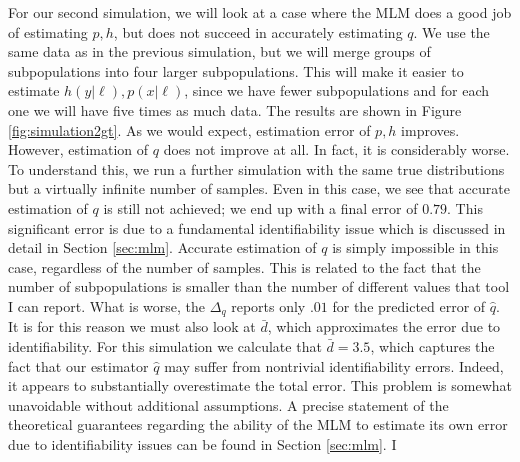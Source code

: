 For our second simulation, we will look at a case where the MLM does a good job of estimating $p,h$, but does not succeed in accurately estimating $q$.   We use the same data as in the previous simulation, but we will merge groups of subpopulations into four larger subpopulations.  This will make it easier to estimate $h(y|\ell),p(x|\ell)$, since we have fewer subpopulations and for each one we will have five times as much data.  The results are shown in Figure \ref{fig:simulation2gt}.  As we would expect, estimation error of $p,h$ improves.  However, estimation of $q$ does not improve at all.  In fact, it is considerably worse.  To understand this, we run a further simulation with the same true distributions but a virtually infinite number of samples.  Even in this case, we see that accurate estimation of $q$ is still not achieved; we end up with a final error of $0.79$.  This significant error is due to a fundamental identifiability issue which is discussed in detail in Section \ref{sec:mlm}.  Accurate estimation of $q$ is simply impossible in this case, regardless of the number of samples.  This is related to the fact that the number of subpopulations is smaller than the number of different values that tool I can report.  What is worse, the $\Delta_q$ reports only $.01$ for the predicted error of $\hat q$.  It is for this reason we must also look at $\bar d$, which approximates the error due to identifiability.  For this simulation we calculate that $\bar d=3.5$, which captures the fact that our estimator $\hat q$ may suffer from nontrivial identifiability errors.  Indeed, it appears to substantially overestimate the total error.  This problem is somewhat unavoidable without additional assumptions.  A precise statement of the theoretical guarantees regarding the ability of the MLM to estimate its own error due to identifiability issues can be found in Section \ref{sec:mlm}.  I

